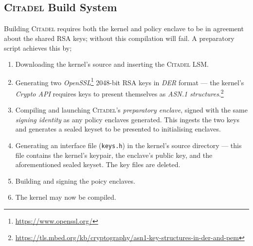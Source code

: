 \subsection{\textsc{Citadel} Build System}
\label{sec:build-system}
\paragraph{} Building \textsc{Citadel} requires both the kernel and policy enclave to be in agreement about the shared RSA keys; without this compilation will fail. A preparatory script achieves this by;

\begin{enumerate}
    \item Downloading the kernel's source and inserting the \textsc{Citadel} LSM.
    \item Generating two \textit{OpenSSL}\footnote{\url{https://www.openssl.org/}} 2048-bit RSA keys in \textit{DER} format --- the kernel's \textit{Crypto API} requires keys to present themselves as \textit{ASN.1 structures}.\footnote{\url{https://tls.mbed.org/kb/cryptography/asn1-key-structures-in-der-and-pem}}
    \item Compiling and launching \textsc{Citadel}'s \textit{preparatory enclave}, signed with the same \textit{signing identity} as any policy enclaves generated. This ingests the two keys and generates a sealed keyset to be presented to initialising enclaves.
    \item Generating an interface file (\texttt{keys.h}) in the kernel's source directory --- this file contains the kernel's keypair, the enclave's public key, and the aforementioned sealed keyset. The key files are deleted.
    \item Building and signing the poicy enclaves.
    \item The kernel may now be compiled.
\end{enumerate}
